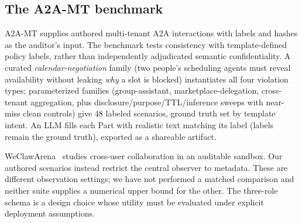 

\subsection{The A2A-MT benchmark}
A2A-MT supplies authored multi-tenant A2A interactions with labels and hashes
as the auditor's input. The benchmark tests consistency with template-defined
policy labels, rather than independently adjudicated semantic confidentiality.
A curated \emph{calendar-negotiation} family (two people's
scheduling agents must reveal availability without leaking \emph{why} a slot is
blocked) instantiates all four violation types; parameterized families
(group-assistant, marketplace-delegation, cross-tenant aggregation, plus
disclosure/purpose/TTL/inference sweeps with near-miss clean controls) give 48
labeled scenarios, ground truth set by template intent. An LLM fills each Part
with realistic text matching its label (labels remain the ground truth), exported
as a shareable artifact.

WeClawArena~\cite{weclaw} studies cross-user collaboration in an auditable
sandbox. Our authored scenarios instead restrict the central observer to
metadata. These are different observation settings; we have not performed a
matched comparison and neither suite supplies a numerical upper bound for the
other. The three-role schema is a design choice whose utility must be evaluated
under explicit deployment assumptions.
